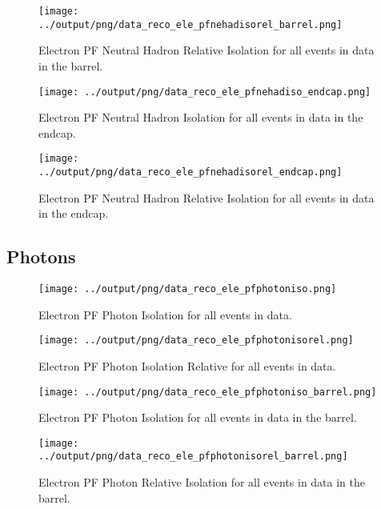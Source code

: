 \documentclass[11pt]{book}
\begin{document}
\begin{figure}[htb]
\centering
\texttt{[image: ../output/png/data\_reco\_ele\_pfnehadisorel\_barrel.png]}
\caption{Electron PF Neutral Hadron Relative Isolation for all events in data in the barrel.}
\label{fig:data_ele_pfnehadisorel_barrel}
\end{figure}

\begin{figure}[htb]
\centering
\texttt{[image: ../output/png/data\_reco\_ele\_pfnehadiso\_endcap.png]}
\caption{Electron PF Neutral Hadron Isolation for all events in data in the endcap.}
\label{fig:data_ele_pfnehadiso_endcap}
\end{figure}

\begin{figure}[htb]
\centering
\texttt{[image: ../output/png/data\_reco\_ele\_pfnehadisorel\_endcap.png]}
\caption{Electron PF Neutral Hadron Relative Isolation for all events in data in the endcap.}
\label{fig:data_ele_pfnehadisorel_endcap}
\end{figure}
\clearpage

\subsection{Photons}
\begin{figure}[htb]
\centering
\texttt{[image: ../output/png/data\_reco\_ele\_pfphotoniso.png]}
\caption{Electron PF Photon Isolation for all events in data.}
\label{fig:data_ele_pfphotoniso}
\end{figure}

\begin{figure}[htb]
\centering
\texttt{[image: ../output/png/data\_reco\_ele\_pfphotonisorel.png]}
\caption{Electron PF Photon Isolation Relative for all events in data.}
\label{fig:data_ele_pfphotonisorel}
\end{figure}

\begin{figure}[htb]
\centering
\texttt{[image: ../output/png/data\_reco\_ele\_pfphotoniso\_barrel.png]}
\caption{Electron PF Photon Isolation for all events in data in the barrel.}
\label{fig:data_ele_pfphotoniso_barrel}
\end{figure}

\begin{figure}[htb]
\centering
\texttt{[image: ../output/png/data\_reco\_ele\_pfphotonisorel\_barrel.png]}
\caption{Electron PF Photon Relative Isolation for all events in data in the barrel.}
\label{fig:data_ele_pfphotonisorel_barrel}
\end{figure}
\end{document}
